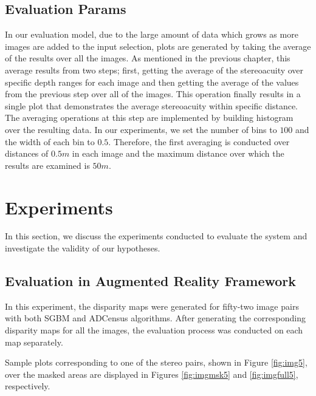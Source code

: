 \subsection{Evaluation Params}
In our evaluation model, due to the large amount of data which grows as more images are added to the input selection, 
plots are generated by taking the average of the results over all the images. As mentioned in the previous chapter, this average results from two steps; 
first, getting the average of the stereoacuity over specific
depth ranges for each image and then getting the average of the values from the previous step over all of the images. This operation finally results in a single plot
that demonstrates the average stereoacuity within specific distance.
The averaging operations at this step are implemented by building histogram over the resulting data. 
In our experiments, we set the number of bins to $100$ and the width of each bin to $0.5$. Therefore, the first averaging is conducted over distances of $0.5m$ 
in each image and the maximum distance over which the results are 
examined is $50m$.


\section{Experiments}
In this section, we discuss the experiments conducted to evaluate the system and investigate the validity of our hypotheses.

\subsection{Evaluation in Augmented Reality Framework}

In this experiment, the disparity maps 
were generated for fifty-two image pairs with both SGBM and ADCensus algorithms. 
After generating the corresponding disparity maps for all the images, 
the evaluation process was conducted on each map separately.

Sample plots corresponding to one of the stereo pairs, shown in Figure \ref{fig:img5},
over the masked areas are displayed in Figures \ref{fig:imgmsk5} and \ref{fig:imgfull5}, respectively.

